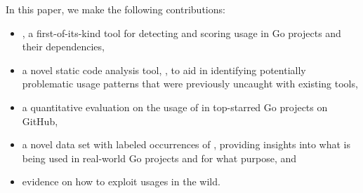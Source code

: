 In this paper, we make the following contributions:
%
\begin{itemize}
\item \toolUsage{}, a first-of-its-kind tool for detecting and scoring \unsafe{} usage in Go projects and their dependencies,
\item a novel static code analysis tool, \toolSA{}, to aid in identifying potentially problematic \unsafe{} usage patterns that were previously uncaught with existing tools,
\item a quantitative evaluation on the usage of \unsafe{} in \projsAnalyzed{} top-starred Go projects on GitHub,
\item a novel data set with  labeled occurrences of \unsafe{}, providing insights into what is being used in real-world Go projects and for what purpose, and
\item evidence on how to exploit \unsafe{} usages in the wild.
\end{itemize}

